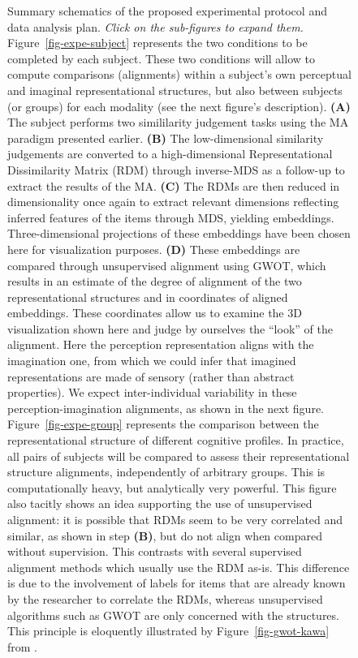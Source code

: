 \documentclass[
  authoryear]{elsarticle}
\begin{document}
\begin{figure}
\begin{minipage}{0.50\linewidth}
\subcaption{\label{fig-expe-group}}

\end{minipage}%

\caption{\label{fig-expe-conditions}Summary schematics of the proposed
experimental protocol and data analysis plan. \emph{Click on the
sub-figures to expand them.} Figure~\ref{fig-expe-subject} represents
the two conditions to be completed by each subject. These two conditions
will allow to compute comparisons (alignments) within a subject's own
perceptual and imaginal representational structures, but also between
subjects (or groups) for each modality (see the next figure's
description). \textbf{(A)} The subject performs two simililarity
judgement tasks using the MA paradigm presented earlier. \textbf{(B)}
The low-dimensional similarity judgements are converted to a
high-dimensional Representational Dissimilarity Matrix (RDM) through
inverse-MDS as a follow-up to extract the results of the MA.
\textbf{(C)} The RDMs are then reduced in dimensionality once again to
extract relevant dimensions reflecting inferred features of the items
through MDS, yielding embeddings. Three-dimensional projections of these
embeddings have been chosen here for visualization purposes.
\textbf{(D)} These embeddings are compared through unsupervised
alignment using GWOT, which results in an estimate of the degree of
alignment of the two representational structures and in coordinates of
aligned embeddings. These coordinates allow us to examine the 3D
visualization shown here and judge by ourselves the ``look'' of the
alignment. Here the perception representation aligns with the
imagination one, from which we could infer that imagined representations
are made of sensory (rather than abstract properties). We expect
inter-individual variability in these perception-imagination alignments,
as shown in the next figure. Figure~\ref{fig-expe-group} represents the
comparison between the representational structure of different cognitive
profiles. In practice, all pairs of subjects will be compared to assess
their representational structure alignments, independently of arbitrary
groups. This is computationally heavy, but analytically very powerful.
This figure also tacitly shows an idea supporting the use of
unsupervised alignment: it is possible that RDMs seem to be very
correlated and similar, as shown in step \textbf{(B)}, but do not align
when compared without supervision. This contrasts with several
supervised alignment methods \citep[such as RSA,
see][]{kriegeskorte2008} which usually use the RDM as-is. This
difference is due to the involvement of labels for items that are
already known by the researcher to correlate the RDMs, whereas
unsupervised algorithms such as GWOT are only concerned with the
structures. This principle is eloquently illustrated by
Figure~\ref{fig-gwot-kawa} from \citet{kawakita2023}.}

\end{figure}%
\end{document}
